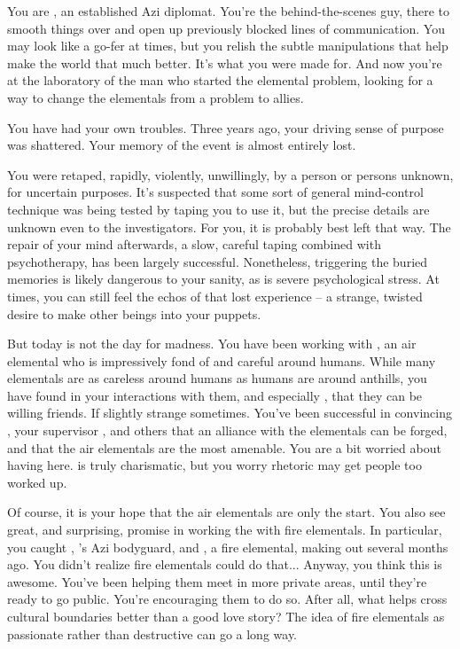 \documentclass[char]{elementals}
\begin{document}
\name{\cDiplomat{}}

You are \cDiplomat{\intro}, an established Azi diplomat.  You're the behind-the-scenes guy, there to smooth things over and open up previously blocked lines of communication.  You may look like a go-fer at times, but you relish the subtle manipulations that help make the world that much better.  It's what you were made for.  And now you're at the laboratory of the man who started the elemental problem, looking for a way to change the elementals from a problem to allies.

You have had your own troubles.  Three years ago, your driving sense of purpose was shattered.  Your memory of the event is almost entirely lost.

You were retaped, rapidly, violently, unwillingly, by a person or persons unknown, for uncertain purposes.  It's suspected that some sort of general mind-control technique was being tested by taping you to use it, but the precise details are unknown even to the investigators.  For you, it is probably best left that way.  The repair of your mind afterwards, a slow, careful taping combined with psychotherapy, has been largely successful.  Nonetheless, triggering the buried memories is likely dangerous to your sanity, as is severe psychological stress.  At times, you can still feel the echos of that lost experience -- a strange, twisted desire to make other beings into your puppets.

But today is not the day for madness.  You have been working with \cNaturalist{\intro}, an air elemental who is impressively fond of and careful around humans.  While many elementals are as careless around humans as humans are around anthills, you have found in your interactions with them, and especially \cNaturalist{}, that they can be willing friends.  If slightly strange sometimes.  You've been successful in convincing \cLeader{\intro}, your supervisor \cAvatar{\intro}, and others that an alliance with the elementals can be forged, and that the air elementals are the most amenable.  You are a bit worried about having \cDema{\intro} here.  \cDema{\They} is truly charismatic, but you worry \cDema{\their} rhetoric may get people too worked up.

Of course, it is your hope that the air elementals are only the start.  You also see great, and surprising, promise in working the with fire elementals.  In particular, you caught \cRomeo{\intro}, \cLeader{}'s Azi bodyguard, and \cJuliet{\intro}, a fire elemental, making out several months ago.  You didn't realize fire elementals could do that...  Anyway, you think this is awesome.  You've been helping them meet in more private areas, until they're ready to go public.  You're encouraging them to do so.  After all, what helps cross cultural boundaries better than a good love story?  The idea of fire elementals as passionate rather than destructive can go a long way.
\end{document}
